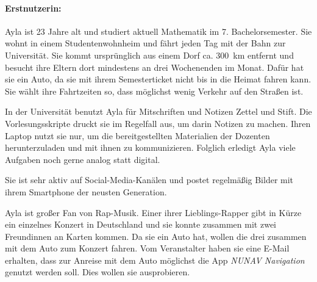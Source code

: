 \paragraph{Erstnutzerin:} Ayla ist 23 Jahre alt und studiert aktuell Mathematik im 7. Bachelorsemester. Sie wohnt in einem Studentenwohnheim und fährt jeden Tag mit der Bahn zur Universität. Sie kommt ursprünglich aus einem Dorf ca. 300~km entfernt und besucht ihre Eltern dort mindestens an drei Wochenenden im Monat. Dafür hat sie ein Auto, da sie mit ihrem Semesterticket nicht bis in die Heimat fahren kann. Sie wählt ihre Fahrtzeiten so, dass möglichst wenig Verkehr auf den Straßen ist.

In der Universität benutzt Ayla für Mitschriften und Notizen Zettel und Stift. Die Vorlesungsskripte druckt sie im Regelfall aus, um darin Notizen zu machen. Ihren Laptop nutzt sie nur, um die bereitgestellten Materialien der Dozenten herunterzuladen und mit ihnen zu kommunizieren. Folglich erledigt Ayla viele Aufgaben noch gerne analog statt digital. 

Sie ist sehr aktiv auf Social-Media-Kanälen und postet regelmäßig Bilder mit ihrem Smartphone der neusten Generation.

Ayla ist großer Fan von Rap-Musik. Einer ihrer Lieblings-Rapper gibt in Kürze ein einzelnes Konzert in Deutschland und sie konnte zusammen mit zwei Freundinnen an Karten kommen. Da sie ein Auto hat, wollen die drei zusammen mit dem Auto zum Konzert fahren. Vom Veranstalter haben sie eine E-Mail erhalten, dass zur Anreise mit dem Auto möglichst die App \textit{NUNAV Navigation} genutzt werden soll. Dies wollen sie ausprobieren.

\newpage

